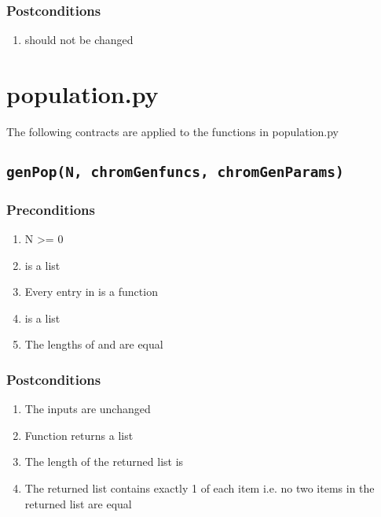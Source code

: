 \documentclass[letterpaper,10pt,english]{sphinxmanual}
\begin{document}
\subsubsection{Postconditions}
\label{contracts:id16}\begin{enumerate}
\item {} 
 should not be changed

\end{enumerate}


\section{population.py}
\label{contracts:population-py}
The following contracts are applied to the functions in population.py


\subsection{\texttt{genPop(N, chromGenfuncs, chromGenParams)}}
\label{contracts:genpop-n-chromgenfuncs-chromgenparams}

\subsubsection{Preconditions}
\label{contracts:id17}\begin{enumerate}
\item {} 
N \textgreater{}= 0

\item {} 
 is a list

\item {} 
Every entry in  is a function

\item {} 
 is a list

\item {} 
The lengths of  and  are equal

\end{enumerate}


\subsubsection{Postconditions}
\label{contracts:id18}\begin{enumerate}
\item {} 
The inputs are unchanged

\item {} 
Function returns a list

\item {} 
The length of the returned list is 

\item {} 
The returned list contains exactly 1 of each item i.e. no two items in the returned list are equal

\end{enumerate}
\end{document}
